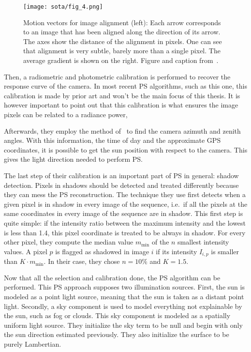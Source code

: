 \begin{figure}
\centering
\texttt{[image: sota/fig\_4.png]}
\caption{Motion vectors for image alignment (left): Each arrow corresponds to an image that has been aligned along the direction of its arrow. The axes show the distance of the alignment in pixels. One can see that alignment is very subtle, barely more than a single pixel. The average gradient is shown on the right. Figure and caption from~\cite{ackermann-cvpr-12}.}
\label{fig:ackermann-alignment}
\end{figure}

Then, a radiometric and photometric calibration is performed to recover the response curve of the camera. In most recent PS algorithms, such as this one, this calibration is made by prior art and won't be the main focus of this thesis. It is however important to point out that this calibration is what ensures the image pixels can be related to a radiance power, 

Afterwards, they employ the method of~\cite{lalonde-ijcv-10} to find the camera azimuth and zenith angles. With this information, the time of day and the approximate GPS coordinates, it is possible to get the sun position with respect to the camera. This gives the light direction needed to perform PS.

The last step of their calibration is an important part of PS in general: shadow detection. Pixels in shadows should be detected and treated differently because they can mess the PS reconstruction. The technique they use first detects when a given pixel is in shadow in every image of the sequence, i.e.\ if all the pixels at the same coordinates in every image of the sequence are in shadow. This first step is quite simple: if the intensity ratio between the maximum intensity and the lowest is less than 1.4, this pixel coordinate is treated to be always in shadow. For every other pixel, they compute the median value $m_\mathrm{min}$ of the $n$ smallest intensity values. A pixel $p$ is flagged as shadowed in image $i$ if its intensity $I_{i,p}$ is smaller than $K \cdot m_\mathrm{min}$. In their case, they chose $n = 10\%$ and $K = 1.5$.

Now that all the selection and calibration done, the PS algorithm can be performed. This PS approach supposes two illumination sources. First, the sun is modeled as a point light source, meaning that the sun is taken as a distant point light. Secondly, a sky component is used to model everything not explainable by the sun, such as fog or clouds. This sky component is modeled as a spatially uniform light source. They initialize the sky term to be null and begin with only the sun direction estimated previously. They also initialize the surface to be purely Lambertian.

